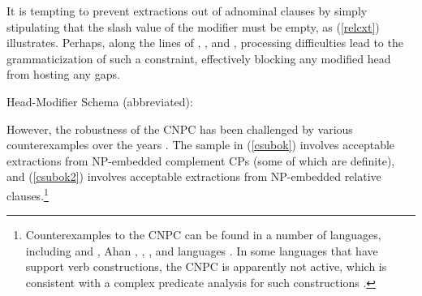 \documentclass[output=paper,biblatex,babelshorthands,newtxmath,draftmode,colorlinks,citecolor=brown]{langscibook}
\begin{document}
\eal \label{cpnpb}
\zl

\eal  \label{cpnpb2}
\zl 

\noindent
It is tempting to prevent extractions out of adnominal clauses by simply stipulating that the {\sc
  slash} value of the modifier must be empty, as (\ref{relcxt}) illustrates.  Perhaps, along the
lines of \citet{fodor78,Fodor83}, \citet{berwickwein}, and \citet{hawkins,hawbook}, processing
difficulties lead to the grammaticization of such a constraint, effectively blocking any modified
head from hosting any gaps.

\vbox{
\ea \label{relcxt}
Head-Modifier Schema (abbreviated):\\
\z 
}

However, the robustness of the CNPC has been challenged by various counterexamples over the years
\parencites[139]{Ross67}[--207]{pollardsag}{kluender}[]{postal98}{saghof}.
The sample in (\ref{csubok}) involves acceptable extractions from NP-embedded complement CPs (some of which are definite), and
(\ref{csubok2}) involves acceptable extractions from NP-embedded relative
clauses.\footnote{Counterexamples to the CNPC can be found in a number of languages, including
   and  \citep{kunojap,Nishigauchi99}, Ahan \citep{saah}, 
  \citep[Chapter 2]{shir},  \citep{allwood,engdahl82}, 
  \citep{taraldsen82} and  languages \citep{Cinque10}.  In some languages that have
  support verb constructions, the CNPC is apparently not active, which is consistent with a complex
  predicate analysis for such constructions \citep{vives}.}
\end{document}
